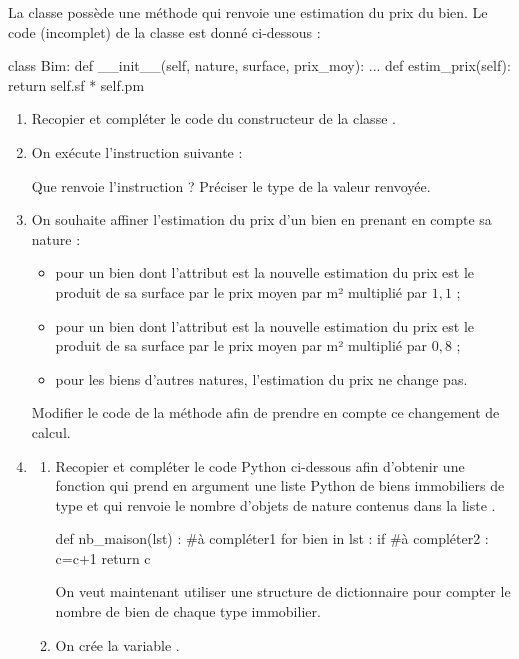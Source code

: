 \documentclass[11pt,a4paper,french,twoside]{PMCours}
\begin{document}
La classe  possède une méthode  qui renvoie une estimation du prix du
bien. Le code (incomplet) de la classe  est donné ci-dessous :
\begin{Python*}
class Bim:
    def __init__(self, nature, surface, prix_moy):
        ...
    def estim_prix(self):
        return self.sf * self.pm
\end{Python*}

\begin{enumerate}
\item Recopier et compléter le code du constructeur de la classe .
\item On exécute l'instruction suivante :

\medskip
{}

Que renvoie l'instruction  ? Préciser le type de la valeur renvoyée.
\item On souhaite affiner l'estimation du prix d'un bien en prenant en compte sa nature :
\begin{itemize}
\item pour un bien dont l'attribut  est  la nouvelle estimation du prix est le
produit de sa surface par le prix moyen par m² multiplié par $1,\!1$ ;
\item pour un bien dont l'attribut  est  la nouvelle estimation du prix est le
produit de sa surface par le prix moyen par m² multiplié par $0,\!8$ ;
\item pour les biens d'autres natures, l'estimation du prix ne change pas.
\end{itemize}
Modifier le code de la méthode  afin de prendre en compte ce changement
de calcul.
\item 
\begin{enumerate} 
\item Recopier et compléter le code Python ci-dessous afin d'obtenir une fonction  qui prend en argument une liste Python de biens immobiliers de type  et qui renvoie le nombre d'objets de nature  contenus dans la liste .
\begin{Python}
def nb_maison(lst) : 
	#à compléter1
	for bien in lst : 
		if #à compléter2 :
			c=c+1
	return c
\end{Python}
On veut maintenant utiliser une structure de dictionnaire pour compter le nombre de bien de chaque type immobilier.
\item On crée la variable .\\

\end{enumerate}
\end{enumerate}
\end{document}
